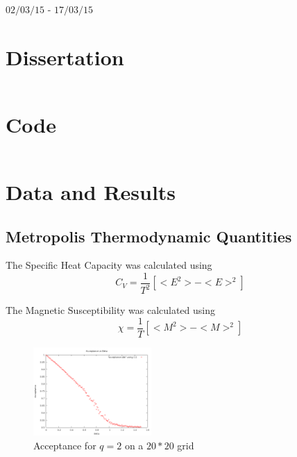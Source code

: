 \documentclass[12pt,a4paper,notitlepage,twoside]{article}
\author{Robert James}
\begin{document}
\begin{Large}
\begin{center}
$02/03/15$ - $17/03/15$
\end{center}
\end{Large}

\section{Dissertation}

\begin{lstlisting}[breaklines]

\end{lstlisting}


\section{Code}

\begin{lstlisting}[breaklines]

\end{lstlisting}

\section{Data and Results}
\subsection{Metropolis Thermodynamic Quantities}

The Specific Heat Capacity was calculated using
\begin{equation}
C_V = \frac{1}{T^2} \left[ <E^2> - <E>^2 \right]
\end{equation}

The Magnetic Susceptibility was calculated using
\begin{equation}
\chi = \frac{1}{T} \left[ <M^2> - <M>^2 \right]
\end{equation}


\begin{figure}[H]
\centering
\includegraphics[width=0.4\textwidth]{q2d20/acceptance.png}
\caption{Acceptance for $q=2$ on a $20*20$ grid}
\end{figure}
\end{document}

